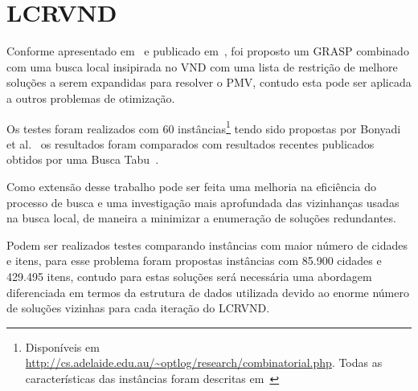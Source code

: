 \section{LCRVND}

Conforme apresentado em~\cite{2017:Araujo} e publicado em~\cite{endm2018:araujo}, foi proposto um GRASP combinado com uma busca local insipirada no VND com uma lista de restrição de melhore soluções a serem expandidas para resolver o PMV, contudo esta pode ser aplicada a outros problemas de otimização.

Os testes foram realizados com 60 instâncias\footnote{Disponíveis em \url{http://cs.adelaide.edu.au/~optlog/research/combinatorial.php}.
Todas as características das instâncias foram descritas em~\cite{Polyakovskiy:2014}} tendo sido propostas por Bonyadi et al.~\cite{Bonyadi:2013} os resultados foram comparados com resultados recentes publicados obtidos por uma Busca Tabu~\cite{Oliveira:2015}.

Como extensão desse trabalho pode ser feita uma melhoria na eficiência do processo de busca e uma investigação mais aprofundada das vizinhanças usadas na busca local, de maneira a minimizar a enumeração de soluções redundantes.

Podem ser realizados testes comparando instâncias com maior número de cidades e itens, para esse problema foram propostas instâncias com 85.900 cidades e 429.495 itens, contudo para estas soluções será necessária uma abordagem diferenciada em termos da estrutura de dados utilizada devido ao enorme número de soluções vizinhas para cada iteração do LCRVND.
